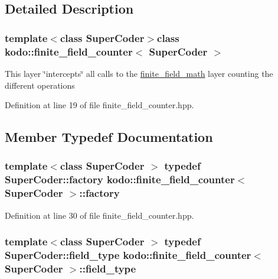 \subsection{Detailed Description}
\subsubsection*{template$<$class Super\-Coder$>$class kodo\-::finite\-\_\-field\-\_\-counter$<$ Super\-Coder $>$}

This layer \char`\"{}intercepts\char`\"{} all calls to the \hyperlink{classkodo_1_1finite__field__math}{finite\-\_\-field\-\_\-math} layer counting the different operations 

Definition at line 19 of file finite\-\_\-field\-\_\-counter.\-hpp.



\subsection{Member Typedef Documentation}
\hypertarget{classkodo_1_1finite__field__counter_afbbc7697ff30ee6b96b67c311c5975d7}{
\subsubsection[{factory}]{\setlength{\rightskip}{0pt plus 5cm}template$<$class Super\-Coder $>$ typedef Super\-Coder\-::factory {\bf kodo\-::finite\-\_\-field\-\_\-counter}$<$ Super\-Coder $>$\-::{\bf factory}}}\label{classkodo_1_1finite__field__counter_afbbc7697ff30ee6b96b67c311c5975d7}






Definition at line 30 of file finite\-\_\-field\-\_\-counter.\-hpp.

\hypertarget{classkodo_1_1finite__field__counter_ad7c95704b9f98e4196759c95dde832a7}{
\subsubsection[{field\-\_\-type}]{\setlength{\rightskip}{0pt plus 5cm}template$<$class Super\-Coder $>$ typedef Super\-Coder\-::field\-\_\-type {\bf kodo\-::finite\-\_\-field\-\_\-counter}$<$ Super\-Coder $>$\-::{\bf field\-\_\-type}}}\label{classkodo_1_1finite__field__counter_ad7c95704b9f98e4196759c95dde832a7}




